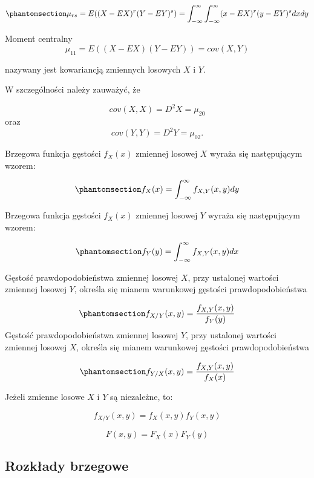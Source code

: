 \documentclass[
  letterpaper,
  DIV=11,
  numbers=noendperiod]{scrreprt}
\begin{document}
\begin{equation}\phantomsection\label{eq-mom_cen_cg}{ \mu_{rs}=E((X-EX)^r(Y-EY)^s)=\int_{-\infty}^{\infty}\int_{-\infty}^{\infty} (x-EX)^r (y-EY)^s dxdy}\end{equation}

Moment centralny \[\mu_{11} = E((X-EX)(Y-EY))=cov(X,Y)\]

nazywany jest kowariancją zmiennych losowych \(X\) i \(Y\).

W szczególności należy zauważyć, że

\[cov(X,X)=D^2X=\mu_{20}\] oraz \[cov(Y,Y)=D^2Y=\mu_{02}.\]

Brzegowa funkcja gęstości \(f_X(x)\) zmiennej losowej \(X\) wyraża się
następującym wzorem:

\begin{equation}\phantomsection\label{eq-brz_cgX}{ f_X(x)=\int_{-\infty}^{\infty}f_{X,Y}(x,y)dy}\end{equation}

Brzegowa funkcja gęstości \(f_X(x)\) zmiennej losowej \(Y\) wyraża się
następującym wzorem:

\begin{equation}\phantomsection\label{eq-brz_cgY}{ f_Y(y)=\int_{-\infty}^{\infty}f_{X,Y}(x,y)dx}\end{equation}

Gęstość prawdopodobieństwa zmiennej losowej \(X\), przy ustalonej
wartości zmiennej losowej \(Y\), określa się mianem warunkowej gęstości
prawdopodobieństwa

\begin{equation}\phantomsection\label{eq-war_cgX}{ f_{X/Y}(x,y) = \frac{f_{X,Y}(x,y)}{f_Y(y)}}\end{equation}
Gęstość prawdopodobieństwa zmiennej losowej \(Y\), przy ustalonej
wartości zmiennej losowej \(X\), określa się mianem warunkowej gęstości
prawdopodobieństwa

\begin{equation}\phantomsection\label{eq-war_cgY}{ f_{Y/X}(x,y) = \frac{f_{X,Y}(x,y)}{f_X(x)}}\end{equation}

Jeżeli zmienne losowe \(X\) i \(Y\) są niezależne, to:

\[f_{X/Y}(x,y)=f_X(x,y)f_Y(x,y)\]

\[F(x,y)=F_X(x)F_Y(y)\]

\subsection{Rozkłady brzegowe}\label{rozkux142ady-brzegowe-1}
\end{document}
